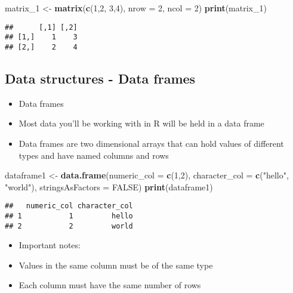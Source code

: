 \documentclass[]{article}
\newenvironment{Shaded}{\begin{snugshade}}{\end{snugshade}}
\newcommand{\KeywordTok}[1]{\textcolor[rgb]{0.13,0.29,0.53}{\textbf{#1}}}
\newcommand{\DataTypeTok}[1]{\textcolor[rgb]{0.13,0.29,0.53}{#1}}
\newcommand{\DecValTok}[1]{\textcolor[rgb]{0.00,0.00,0.81}{#1}}
\newcommand{\StringTok}[1]{\textcolor[rgb]{0.31,0.60,0.02}{#1}}
\newcommand{\OtherTok}[1]{\textcolor[rgb]{0.56,0.35,0.01}{#1}}
\newcommand{\NormalTok}[1]{#1}
\providecommand{\tightlist}{%
  \setlength{\itemsep}{0pt}\setlength{\parskip}{0pt}}
\begin{document}
\begin{Shaded}
\begin{Highlighting}[]
\NormalTok{matrix_}\DecValTok{1}\NormalTok{ <-}\StringTok{ }\KeywordTok{matrix}\NormalTok{(}\KeywordTok{c}\NormalTok{(}\DecValTok{1}\NormalTok{,}\DecValTok{2}\NormalTok{, }\DecValTok{3}\NormalTok{,}\DecValTok{4}\NormalTok{), }\DataTypeTok{nrow =} \DecValTok{2}\NormalTok{, }\DataTypeTok{ncol =} \DecValTok{2}\NormalTok{)}
\KeywordTok{print}\NormalTok{(matrix_}\DecValTok{1}\NormalTok{)}
\end{Highlighting}
\end{Shaded}

\begin{verbatim}
##      [,1] [,2]
## [1,]    1    3
## [2,]    2    4
\end{verbatim}

\subsection{Data structures - Data
frames}\label{data-structures---data-frames}

\begin{itemize}
\tightlist
\item
  Data frames
\item
  Most data you'll be working with in R will be held in a data frame
\item
  Data frames are two dimensional arrays that can hold values of
  different types and have named columns and rows
\end{itemize}

\begin{Shaded}
\begin{Highlighting}[]
\NormalTok{dataframe1 <-}\StringTok{ }\KeywordTok{data.frame}\NormalTok{(}\DataTypeTok{numeric_col =} \KeywordTok{c}\NormalTok{(}\DecValTok{1}\NormalTok{,}\DecValTok{2}\NormalTok{), }\DataTypeTok{character_col =} \KeywordTok{c}\NormalTok{(}\StringTok{"hello"}\NormalTok{, }\StringTok{"world"}\NormalTok{), }\DataTypeTok{stringsAsFactors =} \OtherTok{FALSE}\NormalTok{)}
\KeywordTok{print}\NormalTok{(dataframe1)}
\end{Highlighting}
\end{Shaded}

\begin{verbatim}
##   numeric_col character_col
## 1           1         hello
## 2           2         world
\end{verbatim}

\begin{itemize}
\tightlist
\item
  Important notes:
\item
  Values in the same column must be of the same type
\item
  Each column must have the same number of rows
\end{itemize}
\end{document}
